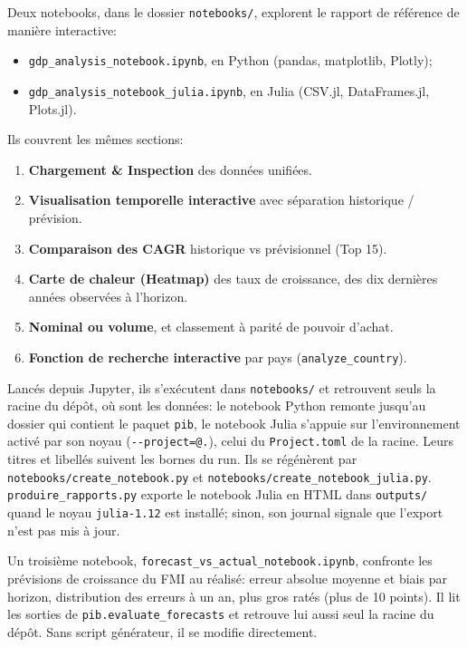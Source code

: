 \documentclass[11pt,a4paper]{article}
\begin{document}
Deux notebooks, dans le dossier \texttt{notebooks/}, explorent le rapport de référence de manière interactive:
\begin{itemize}
    \item \texttt{gdp\_analysis\_notebook.ipynb}, en Python (pandas, matplotlib, Plotly);
    \item \texttt{gdp\_analysis\_notebook\_julia.ipynb}, en Julia (CSV.jl, DataFrames.jl, Plots.jl).
\end{itemize}
Ils couvrent les mêmes sections:
\begin{enumerate}
    \item \textbf{Chargement \& Inspection} des données unifiées.
    \item \textbf{Visualisation temporelle interactive} avec séparation historique / prévision.
    \item \textbf{Comparaison des CAGR} historique vs prévisionnel (Top 15).
    \item \textbf{Carte de chaleur (Heatmap)} des taux de croissance, des dix dernières années observées à l'horizon.
    \item \textbf{Nominal ou volume}, et classement à parité de pouvoir d'achat.
    \item \textbf{Fonction de recherche interactive} par pays (\texttt{analyze\_country}).
\end{enumerate}

Lancés depuis Jupyter, ils s'exécutent dans \texttt{notebooks/} et retrouvent seuls la racine du dépôt, où sont les données: le notebook Python remonte jusqu'au dossier qui contient le paquet \texttt{pib}, le notebook Julia s'appuie sur l'environnement activé par son noyau (\texttt{-{}-project=@.}), celui du \texttt{Project.toml} de la racine. Leurs titres et libellés suivent les bornes du run. Ils se régénèrent par \texttt{notebooks/create\_notebook.py} et \texttt{notebooks/create\_notebook\_julia.py}. \texttt{produire\_rapports.py} exporte le notebook Julia en HTML dans \texttt{outputs/} quand le noyau \texttt{julia-1.12} est installé; sinon, son journal signale que l'export n'est pas mis à jour.

Un troisième notebook, \texttt{forecast\_vs\_actual\_notebook.ipynb}, confronte les prévisions de croissance du FMI au réalisé: erreur absolue moyenne et biais par horizon, distribution des erreurs à un an, plus gros ratés (plus de 10 points). Il lit les sorties de \texttt{pib.evaluate\_forecasts} et retrouve lui aussi seul la racine du dépôt. Sans script générateur, il se modifie directement.
\end{document}
